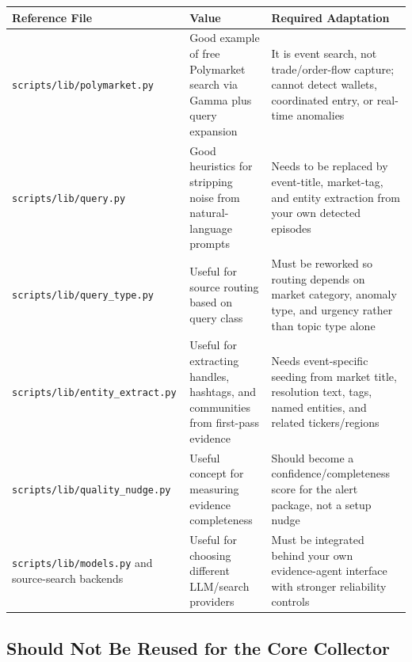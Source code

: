 \documentclass[11pt, letterpaper]{article}
\begin{document}
\begin{longtable}{p{3.6cm}p{4.8cm}p{5.2cm}}
\toprule
\textbf{Reference File} & \textbf{Value} & \textbf{Required Adaptation} \\
\midrule
\endhead
\texttt{scripts/lib/polymarket.py} & Good example of free Polymarket search via Gamma plus query expansion & It is event search, not trade/order-flow capture; cannot detect wallets, coordinated entry, or real-time anomalies \\
\texttt{scripts/lib/query.py} & Good heuristics for stripping noise from natural-language prompts & Needs to be replaced by event-title, market-tag, and entity extraction from your own detected episodes \\
\texttt{scripts/lib/query\_type.py} & Useful for source routing based on query class & Must be reworked so routing depends on market category, anomaly type, and urgency rather than topic type alone \\
\texttt{scripts/lib/entity\_extract.py} & Useful for extracting handles, hashtags, and communities from first-pass evidence & Needs event-specific seeding from market title, resolution text, tags, named entities, and related tickers/regions \\
\texttt{scripts/lib/quality\_nudge.py} & Useful concept for measuring evidence completeness & Should become a confidence/completeness score for the alert package, not a setup nudge \\
\texttt{scripts/lib/models.py} and source-search backends & Useful for choosing different LLM/search providers & Must be integrated behind your own evidence-agent interface with stronger reliability controls \\
\bottomrule
\end{longtable}

\subsection{Should Not Be Reused for the Core Collector}
\end{document}
